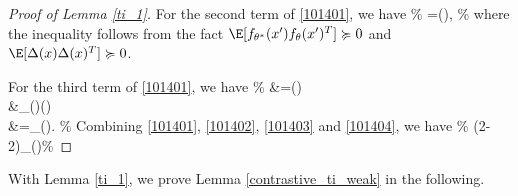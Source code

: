 \begin{proof}[Proof of Lemma \ref{ti_1}]
For the second term of \eqref{101401}, we have
\%\label{101403}
=\Tr\Big(\cdot{}\Big),
\%
where the inequality follows from the fact $\E[f_{\theta^* }(x')f_{\theta}(x')^{T}]\succcurlyeq 0$ and $\E[\Delta(x)\Delta(x)^T]\succcurlyeq 0$.



For the third term of \eqref{101401}, we have
\%\label{101404}
&=\Tr\Big(\cdot{}\Big)\notag\\
&\geq \sigma_{\min}\big(\big)\Tr\Big(\Big)\notag\\
&=\sigma_{\min}\big(\big)\E[\|\Delta(x)\|^2_2].
\%
Combining \eqref{101401}, \eqref{101402}, \eqref{101403} and \eqref{101404}, we have
\%
\E{}\geq (2-2)\sigma_{\min}\big(\big)\E[\|\Delta(x)\|^2_2]
\%
\end{proof}

With Lemma \ref{ti_1}, we prove Lemma \ref{contrastive_ti_weak} in the following.


